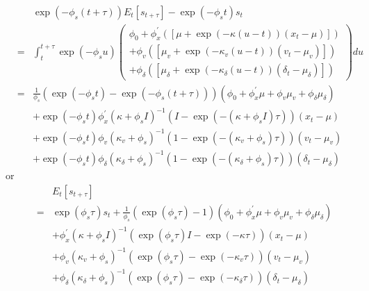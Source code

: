 \documentclass{article}
\begin{document}
\begin{eqnarray*}
&&\exp \left( -\phi _{s}\left( t+\tau \right) \right) E_{t}\left[ s_{t+\tau }%
\right] -\exp \left( -\phi _{s}t\right) s_{t} \\
&=&\int_{t}^{t+\tau }\exp \left( -\phi _{s}u\right) \left( 
\begin{array}{c}
\phi _{0}+\phi _{x}^{\prime }\left( \left[ \mu +\exp \left( -\kappa \left(
u-t\right) \right) \left( x_{t}-\mu \right) \right] \right) \\ 
+\phi _{v}\left( \left[ \mu _{v}+\exp \left( -\kappa _{v}\left( u-t\right)
\right) \left( v_{t}-\mu _{v}\right) \right] \right) \\ 
+\phi _{\delta }\left( \left[ \mu _{\delta }+\exp \left( -\kappa _{\delta
}\left( u-t\right) \right) \left( \delta _{t}-\mu _{\delta }\right) \right]
\right)%
\end{array}%
\right) du \\
&=&\frac{1}{\phi _{s}}\left( \exp \left( -\phi _{s}t\right) -\exp \left(
-\phi _{s}\left( t+\tau \right) \right) \right) \left( \phi _{0}+\phi
_{x}^{\prime }\mu +\phi _{v}\mu _{v}+\phi _{\delta }\mu _{\delta }\right) \\
&&+\exp \left( -\phi _{s}t\right) \phi _{x}^{\prime }\left( \kappa +\phi
_{s}I\right) ^{-1}\left( I-\exp \left( -\left( \kappa +\phi _{s}I\right)
\tau \right) \right) \left( x_{t}-\mu \right) \\
&&+\exp \left( -\phi _{s}t\right) \phi _{v}\left( \kappa _{v}+\phi
_{s}\right) ^{-1}\left( 1-\exp \left( -\left( \kappa _{v}+\phi _{s}\right)
\tau \right) \right) \left( v_{t}-\mu _{v}\right) \\
&&+\exp \left( -\phi _{s}t\right) \phi _{\delta }\left( \kappa _{\delta
}+\phi _{s}\right) ^{-1}\left( 1-\exp \left( -\left( \kappa _{\delta }+\phi
_{s}\right) \tau \right) \right) \left( \delta _{t}-\mu _{\delta }\right)
\end{eqnarray*}%
or%
\begin{eqnarray*}
&&E_{t}\left[ s_{t+\tau }\right] \\
&=&\exp \left( \phi _{s}\tau \right) s_{t}+\frac{1}{\phi _{s}}\left( \exp
\left( \phi _{s}\tau \right) -1\right) \left( \phi _{0}+\phi _{x}^{\prime
}\mu +\phi _{v}\mu _{v}+\phi _{\delta }\mu _{\delta }\right) \\
&&+\phi _{x}^{\prime }\left( \kappa +\phi _{s}I\right) ^{-1}\left( \exp
\left( \phi _{s}\tau \right) I-\exp \left( -\kappa \tau \right) \right)
\left( x_{t}-\mu \right) \\
&&+\phi _{v}\left( \kappa _{v}+\phi _{s}\right) ^{-1}\left( \exp \left( \phi
_{s}\tau \right) -\exp \left( -\kappa _{v}\tau \right) \right) \left(
v_{t}-\mu _{v}\right) \\
&&+\phi _{\delta }\left( \kappa _{\delta }+\phi _{s}\right) ^{-1}\left( \exp
\left( \phi _{s}\tau \right) -\exp \left( -\kappa _{\delta }\tau \right)
\right) \left( \delta _{t}-\mu _{\delta }\right)
\end{eqnarray*}%
\end{document}
